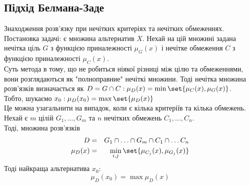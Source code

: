 \subsection{Підхід Белмана-Заде}
Знаходження розв’язку при нечітких критеріях та нечітких обмеженнях.\\
Постановка задачі: є множина альтернатив $X$. Нехай на цій множині задана нечітка ціль $G$ з функцією приналежності $\mu_G(x)$ і нечітке обмеження $C$ з функцією приналежності $\mu_C(x)$.\\
Суть метода в тому, що не робиться ніякої різниці між цілю та обмеженнями, вони розглядаються як "полноправние" нечіткі множини. Тоді нечітка множина розв’язків визначається як $D = G \cap C:\mu_D(x) = \min\set{\mu_C(x),\mu_G(x)}$. \\
Тобто, шукаємо $x_0:\mu_D(x_0) = \max\set{\mu_D(x)}$\\
Це можна узагальнити на випадок, коли є кілька критеріїв та кілька обмежень. Нехай є $m$ цілій $G_1,\ldots,G_m$ та $n$ нечітких обмежень $C_1,\ldots,C_n$.\\
Тоді, множина розв’язків 
\begin{eqnarray}
D &=& G_1\cap \ldots\cap G_m \cap C_1\cap\ldots C_n\\
\mu_D(x) &=& \min\limits_{i,j} \set{\mu_{C_j}(x),\mu_{G_j}(x)}
\end{eqnarray}
Тоді найкраща альтернатива $x_0$:
\begin{equation}
\mu_D(x_0) = \max\mu_D(x)
\end{equation}
